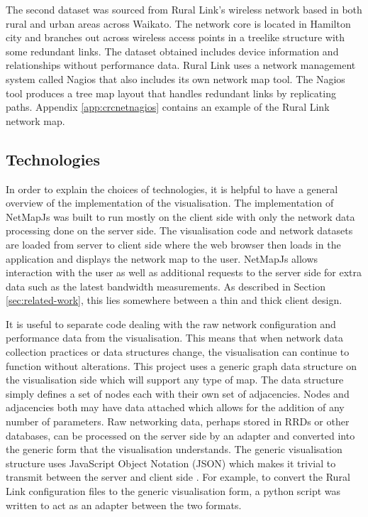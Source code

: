 \documentclass[11pt, a4paper]{article}
\begin{document}
The second dataset was sourced from Rural Link's wireless network based in both
rural and urban areas across Waikato. The network core is located in Hamilton
city and branches out across wireless access points in a treelike structure
with some redundant links. The dataset obtained includes device information and
relationships without performance data. Rural Link uses a network management
system called Nagios that also includes its own network map tool. The Nagios
tool produces a tree map layout that handles redundant links by replicating
paths. Appendix \ref{app:crcnetnagios} contains an example of the Rural Link
network map. 


\subsection{Technologies}
\label{sec:technologies}

In order to explain the choices of technologies, it is helpful to have a general
overview of the implementation of the visualisation. The implementation of
NetMapJs was built to run mostly on the client side with only the network data
processing done on the server side. The visualisation code and network datasets
are loaded from server to client side where the web browser then loads in the
application and displays the network map to the user. NetMapJs allows
interaction with the user as well as additional requests to the server side for
extra data such as the latest bandwidth measurements. As described in Section
\ref{sec:related-work}, this lies somewhere between a thin and thick client
design.

It is useful to separate code dealing with the raw network configuration and
performance data from the visualisation. This means that when network data
collection practices or data structures change, the visualisation can continue
to function without alterations. This project uses a generic graph data
structure on the visualisation side which will support any type of map. The data
structure simply defines a set of nodes each with their own set of adjacencies.
Nodes and adjacencies both may have data attached which allows for the addition
of any number of parameters. Raw networking data, perhaps stored in RRDs or
other databases, can be processed on the server side by an adapter and converted
into the generic form that the visualisation understands. The generic
visualisation structure uses JavaScript Object Notation (JSON) which makes it
trivial to transmit between the server and client side \cite{rfc4627}. For
example, to convert the Rural Link configuration files to the generic
visualisation form, a python script was written to act as an adapter between the
two formats. 
\end{document}
